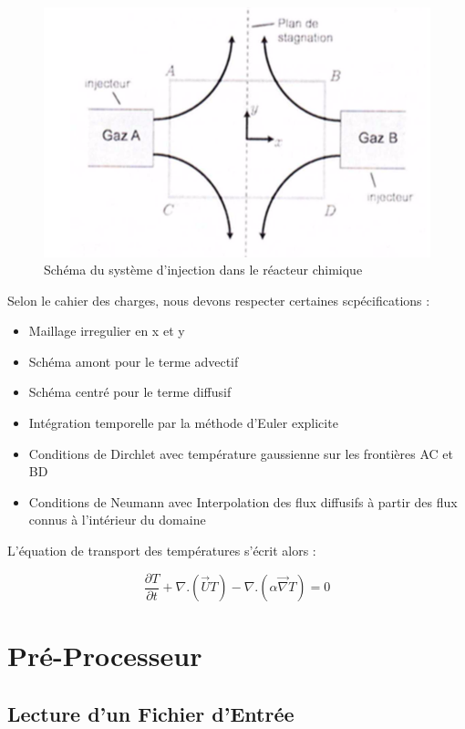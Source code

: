 \documentclass[a4paper,oneside]{article}
\makeatletter
\def\bigcenter{\trivlist \bigcentering\item\relax}
\def\bigcentering{\let\\\@centercr\rightskip\@bigflushglue%
\leftskip\@bigflushglue
\parindent\z@\parfillskip\z@skip}
\makeatother
\begin{document}
\begin{figure}[h!]
\bigcenter
\includegraphics[scale=0.8]{Schema_reacteur.PNG}
\caption{Schéma du système d'injection dans le réacteur chimique}
\end{figure}

Selon le cahier des charges, nous devons respecter certaines scpécifications :
\begin{itemize}
	\item Maillage irregulier en x et y
	\item Schéma amont pour le terme advectif
	\item Schéma centré pour le terme diffusif
	\item Intégration temporelle par la méthode d'Euler explicite
	\item Conditions de Dirchlet avec température gaussienne sur les frontières AC et BD
	\item Conditions de Neumann avec Interpolation des flux diffusifs à partir des flux connus à l'intérieur du domaine\\
\end{itemize}

L'équation de transport des températures s'écrit alors :

\[
\frac{\partial T}{\partial t} + \nabla . (\overrightarrow{U}T) - \nabla . (\alpha \overrightarrow{\nabla}T) = 0 
\]

\section{Pré-Processeur}
\subsection{Lecture d'un Fichier d'Entrée}
\end{document}
